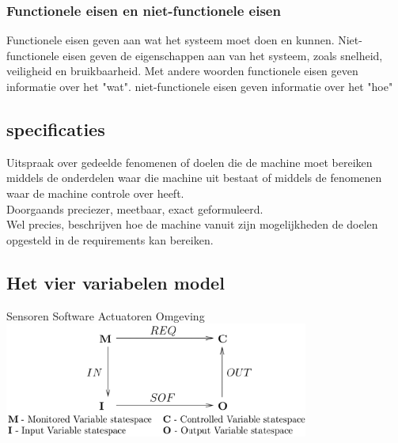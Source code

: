 \documentclass{article}%
\begin{document}
\subsubsection{Functionele eisen en niet-functionele eisen}
Functionele eisen geven aan wat het systeem moet doen en kunnen. Niet-functionele eisen geven de eigenschappen aan van het systeem, zoals snelheid, veiligheid en bruikbaarheid. Met andere woorden functionele eisen geven informatie over het "wat". niet-functionele eisen geven informatie over het "hoe"
%

\subsection{specificaties}
Uitspraak over gedeelde fenomenen of doelen die de machine moet bereiken middels de onderdelen waar die machine uit bestaat of middels de fenomenen waar de machine controle over heeft.
\\
Doorgaands preciezer, meetbaar, exact geformuleerd.
\\
Wel precies, beschrijven hoe de machine vanuit zijn mogelijkheden de doelen opgesteld in de requirements kan bereiken.

\subsection{Het vier variabelen model}
Sensoren Software Actuatoren Omgeving
\\
\includegraphics[width=10cm]{pictures/4_var_model.png}
\\
\cite{https://www.researchgate.net/figure/4-Variable-Model-of-Parnas-Madey_fig3_270733268}
\end{document}

